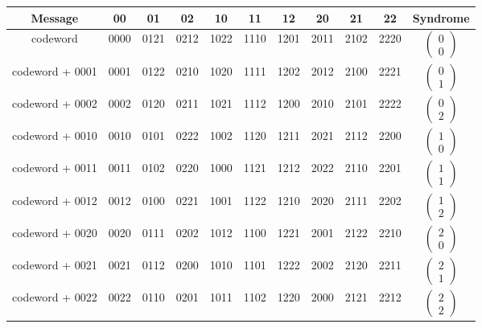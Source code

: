 \documentclass{article}
\begin{document}
\begin{center}
\begin{tabular}{|c| c c c c c c c c c |c|}
\hline
Message  & 00     & 01     & 02    & 10    & 11     &12     & 20     & 21    & 22     & Syndrome\\
\hline
codeword            & 0000 & 0121 & 0212 & 1022 & 1110 & 1201 & 2011 & 2102 & 2220 & $\begin{pmatrix}0\\0\end{pmatrix}$\\
\hline
codeword + 0001 & 0001 & 0122 & 0210 & 1020 & 1111 & 1202 & 2012 & 2100 & 2221 & $\begin{pmatrix}0\\1\end{pmatrix}$\\
\hline
codeword + 0002 & 0002 & 0120 & 0211 & 1021 & 1112 & 1200 & 2010 & 2101 & 2222 & $\begin{pmatrix}0\\2\end{pmatrix}$\\
\hline
codeword + 0010 & 0010 & 0101 & 0222 & 1002 & 1120 & 1211 & 2021 & 2112 & 2200 & $\begin{pmatrix}1\\0\end{pmatrix}$\\
\hline
codeword + 0011 & 0011 & 0102 & 0220 & 1000 & 1121 & 1212 & 2022 & 2110 & 2201 & $\begin{pmatrix}1\\1\end{pmatrix}$\\
\hline
codeword + 0012 & 0012 & 0100 & 0221 & 1001 & 1122 & 1210 & 2020 & 2111 & 2202 & $\begin{pmatrix}1\\2\end{pmatrix}$\\
\hline
codeword + 0020 & 0020 & 0111 & 0202 & 1012 & 1100 & 1221 & 2001 & 2122 & 2210 & $\begin{pmatrix}2\\0\end{pmatrix}$\\
\hline
codeword + 0021 & 0021 & 0112 & 0200 & 1010 & 1101 & 1222 & 2002 & 2120 & 2211 & $\begin{pmatrix}2\\1\end{pmatrix}$\\
\hline
codeword + 0022 & 0022 & 0110 & 0201 & 1011 & 1102 & 1220 & 2000 & 2121 & 2212 & $\begin{pmatrix}2\\2\end{pmatrix}$\\
\hline
\end{tabular}
\end{center}
\end{document}
